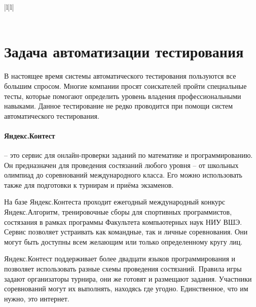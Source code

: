 \begin{table}[]
\begin{tabular}{|l|l|}
		                                                                                                                                                                                                                                                                             \\ \hline
		                                                                                \\  \hline
	\end{tabular}
\end{table}

\section{ Задача автоматизации тестирования }
В настоящее время системы автоматического тестирования пользуются все большим спросом. Многие компании просят соискателей пройти специальные тесты, которые помогают определить уровень владения профессиональными навыками. Данное тестирование не редко проводится при помощи систем автоматического тестирования.

\paragraph{Яндекс.Контест} -- это сервис для онлайн-проверки заданий по математике и программированию. Он предназначен для проведения состязаний любого уровня -- от школьных олимпиад до соревнований международного класса. Его можно использовать также для подготовки к турнирам и приёма экзаменов.

На базе Яндекс.Контеста проходит ежегодный международный конкурс Яндекс.Алгоритм, тренировочные сборы для спортивных программистов, состязания в рамках программы Факультета компьютерных наук НИУ ВШЭ. Сервис позволяет устраивать как командные, так и личные соревнования. Они могут быть доступны всем желающим или только определенному кругу лиц.

Яндекс.Контест поддерживает более двадцати языков программирования и позволяет использовать разные схемы проведения состязаний. Правила игры задают организаторы турнира, они же готовят и размещают задания. Участники соревнований могут их выполнять, находясь где угодно. Единственное, что им нужно, это интернет.

